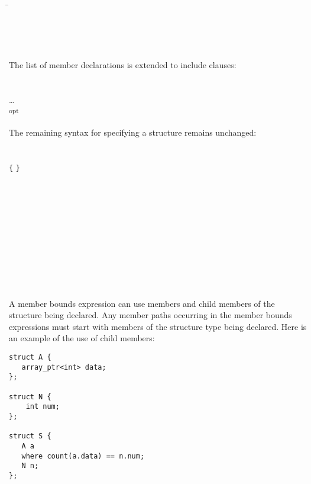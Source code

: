\begin{tabbing}
\=\\
\>  \\
\>  \code{:}
    \\
\>  \code{:} 
 \\
\\
The list of member declarations is extended to include 
clauses:\\
\\
\\
\> \ldots{} \\
\> \textsubscript{opt}  \\
\\
The remaining syntax for specifying a structure remains unchanged: \\
\\
\\
\>  \lstinline|{|
 \lstinline|}| \\
\\
 \\
\>  \\
\>  \\
\\
 \\
\>  \code{;} \\
\\
 \\
\>  \\
\>  \code{,}  
\end{tabbing}

A member bounds expression can use members and child members of the
structure being declared. Any member paths occurring in the member
bounds expressions must start with members of the structure type being
declared. Here is an example of the use of child members:

\begin{lstlisting}
struct A {
   array_ptr<int> data;
};

struct N {
    int num;
};

struct S {
   A a
   where count(a.data) == n.num;
   N n;
};
\end{lstlisting}

